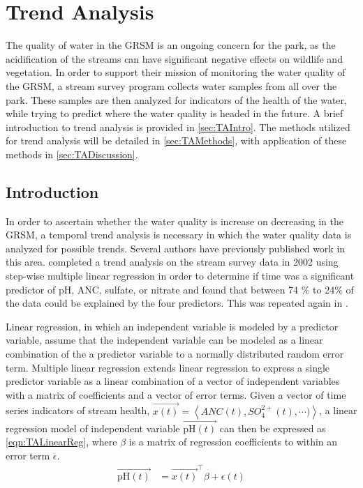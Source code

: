 \chapter{Trend Analysis}\label{ch:TA}
The quality of water in the GRSM is an ongoing concern for the park, as the acidification of the streams can have significant negative effects on wildlife and vegetation.
In order to support their mission of monitoring the water quality of the GRSM, a stream survey program collects water samples from all over the park.
These samples are then analyzed for indicators of the health of the water, while trying to predict where the water quality is headed in the future. 
A brief introduction to trend analysis is provided in \autoref{sec:TAIntro}.
The methods utilized for trend analysis will be detailed in \autoref{sec:TAMethods}, with application of these methods in \autoref{sec:TADiscussion}.

\section{Introduction}
\label{sec:TAIntro}

In order to ascertain whether the water quality is increase on decreasing in the GRSM, a temporal trend analysis is necessary in which the water quality data is analyzed for possible trends.
Several authors have previously published work in this area.
\citet{robinson2008ph} completed a trend analysis on the stream survey data in 2002 using step-wise multiple linear regression in order to determine if time was a significant predictor of pH, ANC, sulfate, or nitrate and found that between 74 \% to 24\% of the data could be explained by the four predictors.
This was repeated again in \citep{cai2012}. 

Linear regression, in which an independent variable is modeled by a predictor variable, assume that the independent variable can be modeled as a linear combination of the a predictor variable to a normally distributed random error term.
Multiple linear regression extends linear regression to express  a single predictor variable as a linear combination of a vector of independent variables with a matrix of coefficients and a vector of error terms.
Given a vector of time series indicators of stream health, $\overrightarrow{x(t)} = \left \langle ANC(t), SO_{4}^{2+}(t),\cdots) \right \rangle$, a linear regression model of independent variable $\overrightarrow{\text{pH}(t)}$ can then be expressed as \eqref{eqn:TALinearReg}, where $\beta$ is a matrix of regression coefficients to within an error term $\epsilon$.
\begin{align}
	\overrightarrow{\text{pH}(t)} &= \overrightarrow{x(t)}^\top \beta+\epsilon(t)
	\label{eqn:TALinearReg}
\end{align}

